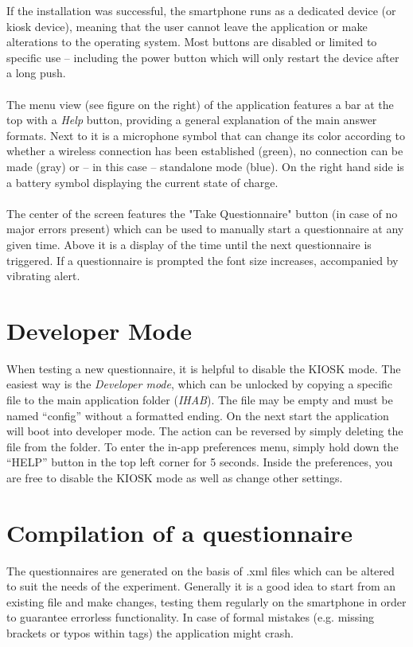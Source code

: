 \documentclass[11pt,a4paper,titlepage]{article}
\begin{document}
If the installation was successful, the smartphone runs as a dedicated device (or kiosk device), meaning that the user cannot leave the application or make alterations to the operating system. Most buttons are disabled or limited to specific use -- including the power button which will only restart the device after a long push.\\
\\
The menu view (see figure on the right) of the application features a bar at the top with a \textit{Help} button, providing a general explanation of the main answer formats. Next to it is a microphone symbol that can change its color according to whether a wireless connection has been established (green), no connection can be made (gray) or -- in this case -- standalone mode (blue). On the right hand side is a battery symbol displaying the current state of charge.\\
\\
The center of the screen features the "Take Questionnaire" button (in case of no major errors present) which can be used to manually start a questionnaire at any given time. Above it is a display of the time until the next questionnaire is triggered. If a questionnaire is prompted the font size increases, accompanied by vibrating alert.\\

\section{Developer Mode}\label{sub:developer}

When testing a new questionnaire, it is helpful to disable the KIOSK mode. The easiest way is the \textit{Developer mode}, which can be unlocked by copying a specific file to the main application folder (\textit{IHAB}). The file may be empty and must be named ``config'' without a formatted ending. On the next start the application will boot into developer mode. The action can be reversed by simply deleting the file from the folder. To enter the in-app preferences menu, simply hold down the ``HELP'' button in the top left corner for 5 seconds. Inside the preferences, you are free to disable the KIOSK mode as well as change other settings.

\section{Compilation of a questionnaire}

The questionnaires are generated on the basis of .xml files which can be altered to suit the needs of the experiment. Generally it is a good idea to start from an existing file and make changes, testing them regularly on the smartphone in order to guarantee errorless functionality. In case of formal mistakes (e.g. missing brackets or typos within tags) the application might crash. 
\end{document}
